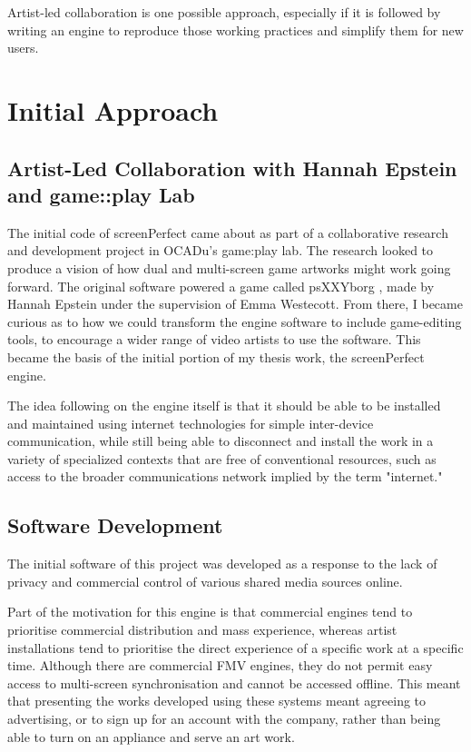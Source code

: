 Artist-led collaboration is one possible approach, especially if it is followed by writing an engine to reproduce those working practices and simplify them for new users. 
 
\section{Initial Approach}
\subsection{Artist-Led Collaboration with Hannah Epstein and game::play Lab}
The initial code of screenPerfect came about as part of a collaborative research and development project in OCADu's game:play lab. The research looked to produce a vision of how dual and multi-screen game artworks might work going forward. The original software powered a game called psXXYborg \parencite{psxxyborg}, made by Hannah Epstein under the supervision of Emma Westecott. From there, I became curious as to how we could transform the engine software to include game-editing tools, to encourage a wider range of video artists to use the software. This became the basis of the initial portion of my thesis work, the screenPerfect engine.

The idea following on the engine itself is that it should be able to be installed and maintained using internet technologies for simple inter-device communication, while still being able to disconnect and install the work in a variety of specialized contexts that are free of conventional resources, such as access to the broader communications network implied by the term "internet."

\subsection{Software Development}
The initial software of this project was developed as a response to the lack of privacy and commercial control of various shared media sources online. 

Part of the motivation for this engine is that commercial engines tend to prioritise commercial distribution and mass experience, whereas artist installations tend to prioritise the direct experience of a specific work at a specific time. Although there are commercial FMV engines, they do not permit easy access to multi-screen synchronisation and cannot be accessed offline. This meant that presenting the works developed using these systems meant agreeing to advertising, or to sign up for an account with the company, rather than being able to turn on an appliance and serve an art work.

